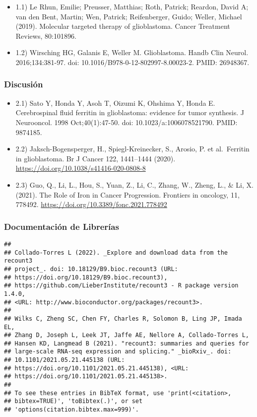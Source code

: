 \documentclass[
]{article}
\providecommand{\tightlist}{%
  \setlength{\itemsep}{0pt}\setlength{\parskip}{0pt}}
\begin{document}
\begin{itemize}
\tightlist
\item
  1.1) Le Rhun, Emilie; Preusser, Matthias; Roth, Patrick; Reardon,
  David A; van den Bent, Martin; Wen, Patrick; Reifenberger, Guido;
  Weller, Michael (2019). Molecular targeted therapy of glioblastoma.
  Cancer Treatment Reviews, 80:101896.
\item
  1.2) Wirsching HG, Galanis E, Weller M. Glioblastoma. Handb Clin
  Neurol. 2016;134:381-97. doi: 10.1016/B978-0-12-802997-8.00023-2.
  PMID: 26948367.
\end{itemize}

\hypertarget{discusiuxf3n-1}{%
\subsubsection{Discusión}\label{discusiuxf3n-1}}

\begin{itemize}
\tightlist
\item
  2.1) Sato Y, Honda Y, Asoh T, Oizumi K, Ohshima Y, Honda E.
  Cerebrospinal fluid ferritin in glioblastoma: evidence for tumor
  synthesis. J Neurooncol. 1998 Oct;40(1):47-50. doi:
  10.1023/a:1006078521790. PMID: 9874185.
\item
  2.2) Jaksch-Bogensperger, H., Spiegl-Kreinecker, S., Arosio, P. et
  al.~Ferritin in glioblastoma. Br J Cancer 122, 1441--1444 (2020).
  \url{https://doi.org/10.1038/s41416-020-0808-8}
\item
  2.3) Guo, Q., Li, L., Hou, S., Yuan, Z., Li, C., Zhang, W., Zheng, L.,
  \& Li, X. (2021). The Role of Iron in Cancer Progression. Frontiers in
  oncology, 11, 778492. \url{https://doi.org/10.3389/fonc.2021.778492}
\end{itemize}

\hypertarget{documentaciuxf3n-de-libreruxedas}{%
\subsubsection{Documentación de
Librerías}\label{documentaciuxf3n-de-libreruxedas}}

\begin{verbatim}
## 
## Collado-Torres L (2022). _Explore and download data from the recount3
## project_. doi: 10.18129/B9.bioc.recount3 (URL:
## https://doi.org/10.18129/B9.bioc.recount3),
## https://github.com/LieberInstitute/recount3 - R package version 1.4.0,
## <URL: http://www.bioconductor.org/packages/recount3>.
## 
## Wilks C, Zheng SC, Chen FY, Charles R, Solomon B, Ling JP, Imada EL,
## Zhang D, Joseph L, Leek JT, Jaffe AE, Nellore A, Collado-Torres L,
## Hansen KD, Langmead B (2021). "recount3: summaries and queries for
## large-scale RNA-seq expression and splicing." _bioRxiv_. doi:
## 10.1101/2021.05.21.445138 (URL:
## https://doi.org/10.1101/2021.05.21.445138), <URL:
## https://doi.org/10.1101/2021.05.21.445138>.
## 
## To see these entries in BibTeX format, use 'print(<citation>,
## bibtex=TRUE)', 'toBibtex(.)', or set
## 'options(citation.bibtex.max=999)'.
\end{verbatim}
\end{document}
